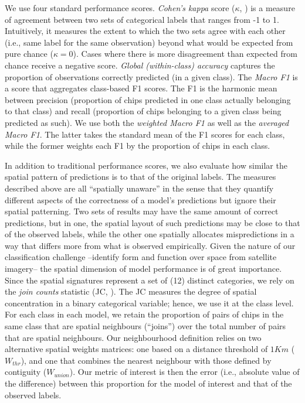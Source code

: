 \documentclass[]{interact}
\theoremstyle{plain}%
\theoremstyle{definition}
\theoremstyle{remark}
\begin{document}
We use four standard performance scores. \textit{Cohen's kappa} score ($\kappa$,
\citealp{cohen1960coefficient}) is a measure of agreement between two sets of
categorical labels that ranges from -1 to 1. Intuitively, it measures the
extent to which the two sets agree with each other (i.e., same label for the
same observation) beyond what would be expected from pure chance
($\kappa=0$). Cases where there is more disagreement than expected from chance
receive a negative score. \textit{Global (within-class) accuracy} captures the
proportion of observations correctly predicted (in a given class). The
\textit{Macro F1} is a score that aggregates class-based F1
scores. The F1 is the harmonic mean between precision (proportion of
chips predicted in one class actually belonging to that class) and recall
(proportion of chips belonging to a given class being predicted as such).
We use both the \textit{weighted Macro F1} as well as the \textit{averaged
Macro F1}. The latter takes the standard mean of the F1 scores for each class,
while the former weights each F1 by the proportion of chips in each class.

In addition to traditional performance scores, we also evaluate how similar
the spatial pattern of predictions is to that of the original labels.
The measures described above are all ``spatially unaware'' in the sense that
they quantify different aspects of the correctness of a model's
predictions but ignore their spatial patterning. Two
sets of results may have the same amount of correct predictions, but in one,
the spatial layout of such predictions may be close to
that of the observed labels, while the other one spatially allocates mispredictions in
a way that differs more from what is observed empirically. Given the nature of
our classification challenge --identify form and
function over space from satellite imagery-- the spatial dimension of model
performance is of great importance. Since the spatial signatures represent a
set of (12) distinct categories, we rely on the \textit{join counts} statistic
(JC, \citealp{cliff1981spatial}). The JC measures the degree of spatial
concentration in a binary categorical variable; hence, we use it at the class
level. For each class in each model, we retain the proportion of pairs of
chips in the same class that are spatial neighbours (``joins'') over the total number of
pairs that are spatial neighbours.
Our neighbourhood definition relies on two alternative spatial weights matrices:
one based on a distance threshold of $1Km$ ($W_{thr}$), and one that combines
the nearest neighbour with those defined by contiguity ($W_{union}$).
Our metric of interest is then the error (i.e., absolute
value of the difference) between this proportion for the model of interest and
that of the observed labels.
\end{document}
